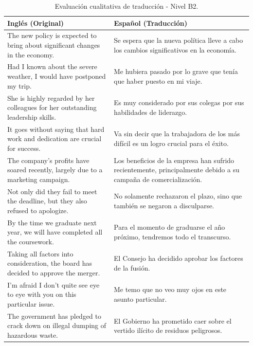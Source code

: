 \begin{table}[t]
    \centering
    \begin{tabular}{p{} p{}}
        \toprule
        \textbf{Inglés (Original)} & \textbf{Español (Traducción)} \\
        \midrule
        The new policy is expected to bring about significant changes in the economy. & Se espera que la nueva política lleve a cabo los cambios significativos en la economía. \\
        Had I known about the severe weather, I would have postponed my trip. & Me hubiera pasado por lo grave que tenía que haber puesto en mi viaje. \\
        She is highly regarded by her colleagues for her outstanding leadership skills. & Es muy considerado por sus colegas por sus habilidades de liderazgo. \\
        It goes without saying that hard work and dedication are crucial for success. & Va sin decir que la trabajadora de los más difícil es un logro crucial para el éxito. \\
        The company's profits have soared recently, largely due to a marketing campaign. & Los beneficios de la empresa han sufrido recientemente, principalmente debido a su campaña de comercialización. \\
        Not only did they fail to meet the deadline, but they also refused to apologize. & No solamente rechazaron el plazo, sino que también se negaron a disculparse. \\
        By the time we graduate next year, we will have completed all the coursework. & Para el momento de graduarse el año próximo, tendremos todo el transcurso. \\
        Taking all factors into consideration, the board has decided to approve the merger. & El Consejo ha decidido aprobar los factores de la fusión. \\
        I'm afraid I don't quite see eye to eye with you on this particular issue. & Me temo que no veo muy ojos en este asunto particular. \\
        The government has pledged to crack down on illegal dumping of hazardous waste. & El Gobierno ha prometido caer sobre el vertido ilícito de residuos peligrosos. \\
        \bottomrule
    \end{tabular}
    \caption{Evaluación cualitativa de traducción - Nivel B2.}
    \label{tab:evaluacion_B2}
\end{table}

